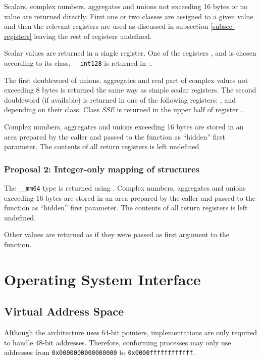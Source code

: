 Scalars, complex numbers, aggregates and unions not exceeding 16 bytes
or no value are returned directly.  First one or two classes are
assigned to a given value and then the relevant registers are used as
discussed in subsection \ref{subsec-registers} leaving the rest of
registers undefined.

Scalar values are returned in a single register. One of the registers
\RAX,  and  is chosen according to its class.
\verb|__int128| is returned in \RDX:\RAX.

The first doubleword of unions, aggregates and real part of complex
values not exceeding 8 bytes is returned the same way as simple scalar
registers.  The second doubleword (if available) is returned in one of
the following registers: \RAX,  and  depending on
their class.  Class \emph{SSE} is returned in the upper half of
register .

Complex numbers, aggregates and unions exceeding 16 bytes are stored
in an area prepared by the caller and passed to the function as
``hidden'' first parameter.  The contents of all return registers is
left undefined.

\subsubsection {Proposal 2: Integer-only mapping of structures}

The \verb|__mm64| type is returned using .  Complex numbers,
aggregates and unions exceeding 16 bytes are stored in an area
prepared by the caller and passed to the function as ``hidden'' first
parameter.  The contents of all return registers is left undefined.

Other values are returned as if they were passed as first argument to
the function.

\section{Operating System Interface}

\subsection{Virtual Address Space}

Although the \xARCH architecture uses 64-bit pointers, implementations
are only required to handle 48-bit addresses.  Therefore, conforming
processes may only use addresses from \texttt{0x0000000000000000} to
\texttt{0x0000ffffffffffff}.

